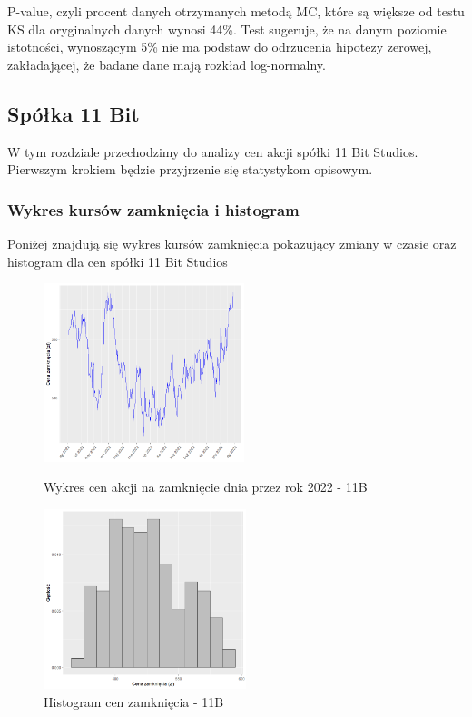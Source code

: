 \documentclass[a4paper,11pt]{article}
\begin{document}
P-value, czyli procent danych otrzymanych metodą MC, które są większe od testu KS dla oryginalnych danych wynosi 44\%. Test sugeruje, że na danym poziomie istotności, wynoszącym 5\% nie ma podstaw do odrzucenia hipotezy zerowej, zakładającej, że badane dane mają rozkład log-normalny.


\newpage
\subsection{Spółka 11 Bit}
W tym rozdziale przechodzimy do analizy cen akcji spółki 11 Bit Studios. Pierwszym krokiem będzie przyjrzenie się statystykom opisowym.
\subsubsection{Wykres kursów zamknięcia i histogram}
Poniżej znajdują się wykres kursów zamknięcia pokazujący zmiany w czasie oraz histogram dla cen spółki 11 Bit Studios

\begin{figure}[h]
\centering
\begin{minipage}[b]{0.40\textwidth}
\centering
\includegraphics[width=\textwidth, height=5.2cm, width = 7cm]{img/Wykres_cen_akcji_11B.png}
\caption{Wykres cen akcji na zamknięcie dnia przez rok 2022 - 11B}
\label{fig:r3}
\end{minipage}
\hfill
\begin{minipage}[b]{0.40\textwidth}
\centering
\includegraphics[width=\textwidth, height=5.25cm, width = 7cm]{img/Histogram_kursu_zamkniecia_11B.png}
\caption{Histogram cen zamknięcia - 11B}
\label{fig:r4}
\end{minipage}
\end{figure}
\end{document}
